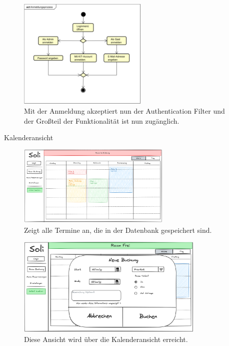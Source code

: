 \documentclass{sdqbeamer}
\begin{document}
\begin{frame}
    \begin{figure}
        \centering
        \includegraphics[width=0.55\textwidth]{pictures/figures/activity/anmeldeprozess}
        \caption{Mit der Anmeldung akzeptiert nun der Authentication Filter und der Großteil der Funktionalität ist nun zugänglich.}
        \label{fig:loginprozess}
    \end{figure}
\end{frame}

\begin{frame}{Kalenderansicht}
    \begin{figure}
        \centering
        \includegraphics[width=0.65\textwidth]{pictures/figures/ui/startseite}
        \caption{Zeigt alle Termine an, die in der Datenbank gespeichert sind.}
        \label{fig:kalender}
    \end{figure}
\end{frame}

\begin{frame}
    \begin{figure}
        \centering
        \includegraphics[width=0.8\textwidth]{pictures/figures/ui/buchungsdialog}
        \caption{Diese Ansicht wird über die Kalenderansicht erreicht.}
        \label{fig:terminerstellen}
    \end{figure}
\end{frame}
\end{document}
